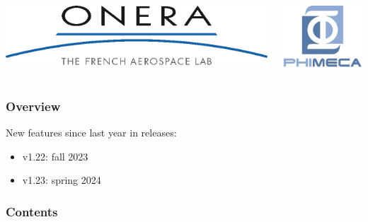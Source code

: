 \documentclass[aspectratio=169]{beamer}
\begin{document}
\begin{frame}
\begin{columns}
  \begin{center}
\includegraphics[height=0.05\textheight]{figures/onera-logo.png}
\end{center}

  \begin{center}
\includegraphics[height=0.08\textheight]{figures/logo-phimeca.png}
\end{center}


  \end{columns}

  \end{frame}

\begin{frame}
\frametitle{Overview}

New features since last year in releases:

\begin{itemize}
\item v1.22: fall 2023
\item v1.23: spring 2024
\end{itemize}

\end{frame}
  

\begin{frame}
\frametitle{Contents}
\tableofcontents
\end{frame}

\end{document}
